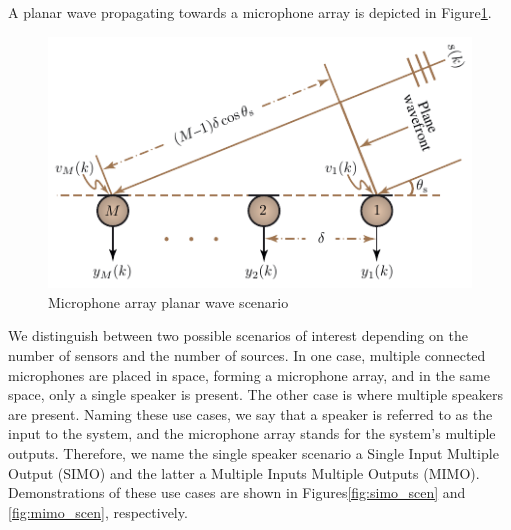 A planar wave propagating towards a microphone array 
is depicted in Figure\;\ref{fig:mic_arr_plan}.

\begin{figure}[H]
    \centering
    \includegraphics[width=\linewidth]{Beamformers/images/mic_array.png}
    \caption{Microphone array planar wave scenario}\label{fig:mic_arr_plan}
\end{figure}

We distinguish between two possible scenarios 
of interest depending on the number 
of sensors and the number of sources.
In one case, multiple connected microphones 
are placed in space, forming a microphone array, 
and in the same space, only a single speaker is present.
The other case is where multiple speakers are present. 
Naming these use cases, we say that a speaker
is referred to as the input to the system, and the microphone array
stands for the system's multiple outputs.
Therefore, we name the single speaker 
scenario a Single Input Multiple Output (SIMO) and the latter 
a Multiple Inputs Multiple Outputs (MIMO).
Demonstrations of these use cases are shown in 
Figures\;\ref{fig:simo_scen} and
\ref{fig:mimo_scen}, respectively.


